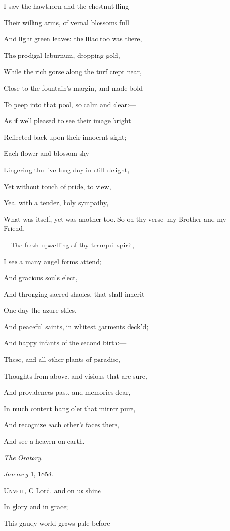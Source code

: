 I saw the hawthorn and the chestnut fling

Their willing arms, of vernal blossoms full

And light green leaves: the lilac too was there,

The prodigal laburnum, dropping gold,

While the rich gorse along the turf crept near,

Close to the fountain's margin, and made bold

To peep into that pool, so calm and clear:—

As if well pleased to see their image bright

Reflected back upon their innocent sight;

Each flower and blossom shy

Lingering the live-long day in still delight,

Yet without touch of pride, to view,

Yea, with a tender, holy sympathy,

What was itself, yet was another too. So on thy verse, my Brother and my Friend,

—The fresh upwelling of thy tranquil spirit,—

I see a many angel forms attend;

And gracious souls elect,

And thronging sacred shades, that shall inherit

One day the azure skies,

And peaceful saints, in whitest garments deck'd;

And happy infants of the second birth:—

These, and all other plants of paradise,

Thoughts from above, and visions that are sure,

And providences past, and memories dear,

In much content hang o'er that mirror pure,

And recognize each other's faces there,

And see a heaven on earth.

\emph{The Oratory}.

\emph{January} 1, 1858.


U\textsc{nveil}, O Lord, and on us shine

In glory and in
grace;

This gaudy world grows pale before

